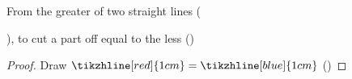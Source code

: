 
	\begin{prop}[Problem]
		From the greater of two straight lines (
			), to cut a part off equal to the less (\tikzhline[blue]{1cm})

	\end{prop}
	\begin{proof}
		Draw $\tikzhline[red]{1cm} = \tikzhline[blue]{1cm}$ ()

	\end{proof}
